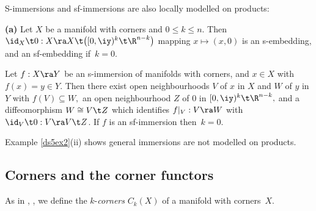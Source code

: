 \documentclass{article}
\begin{document}
S-immersions and sf-immersions are also locally modelled on
products:

\begin{prop}{\bf(a)} Let\/ $X$ be a manifold with corners and\/
$0\le k\le n$. Then $\id_X\t 0:X\ra X\t\bigl([0,\iy)^k\t\R^{n-k}
\bigr)$ mapping $x\mapsto(x,0)$ is an s-embedding, and an
sf-embedding if\/~$k=0$.
\smallskip

 Let\/ $f:X\ra Y$ be an s-immersion of manifolds
with corners, and\/ $x\in X$ with\/ $f(x)=y\in Y$. Then there exist
open neighbourhoods $V$ of\/ $x$ in $X$ and\/ $W$ of\/ $y$ in $Y$
with\/ $f(V)\subseteq W,$ an open neighbourhood\/ $Z$ of\/ $0$ in
$[0,\iy)^k\t\R^{n-k},$ and a diffeomorphism $W\cong V\t Z$ which
identifies $f\vert_V:V\ra W$ with\/ $\id_V\t 0:V\ra V\t Z$. If\/ $f$
is an sf-immersion then\/~$k=0$.
\label{ds5prop3}
\end{prop}

Example \ref{ds5ex2}(ii) shows general immersions are not modelled
on products.

\subsection{Corners and the corner functors}
\label{ds53}

As in \cite[\S 2]{Joyc3}, \cite[\S 5.5]{Joyc6}, we define the
$k$-{\it corners\/} $C_k(X)$ of a manifold with corners~$X$.
\end{document}
